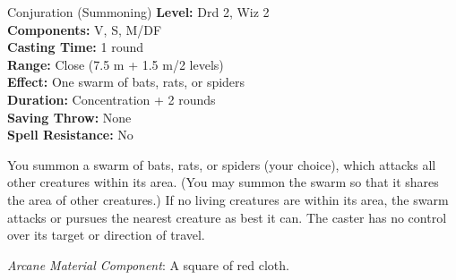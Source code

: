 {Conjuration (Summoning)}
{
	\textbf{Level:}
	Drd 2, Wiz 2\\
	\textbf{Components:}
	V, S, M/DF\\
	\textbf{Casting Time:}
	1 round\\
	\textbf{Range:}
	Close (7.5 m + 1.5 m/2 levels)\\
	\textbf{Effect:}
	One swarm of bats, rats, or spiders\\
	\textbf{Duration:}
	Concentration + 2 rounds\\
	\textbf{Saving Throw:}
	None\\
	\textbf{Spell Resistance:}
	No\\
}
{
	You summon a swarm of bats, rats, or spiders (your choice), which attacks all other creatures within its area. (You may summon the swarm so that it shares the area of other creatures.) If no living creatures are within its area, the swarm attacks or pursues the nearest creature as best it can. The caster has no control over its target or direction of travel.

	\textit{Arcane Material Component}:
	A square of red cloth.

}
